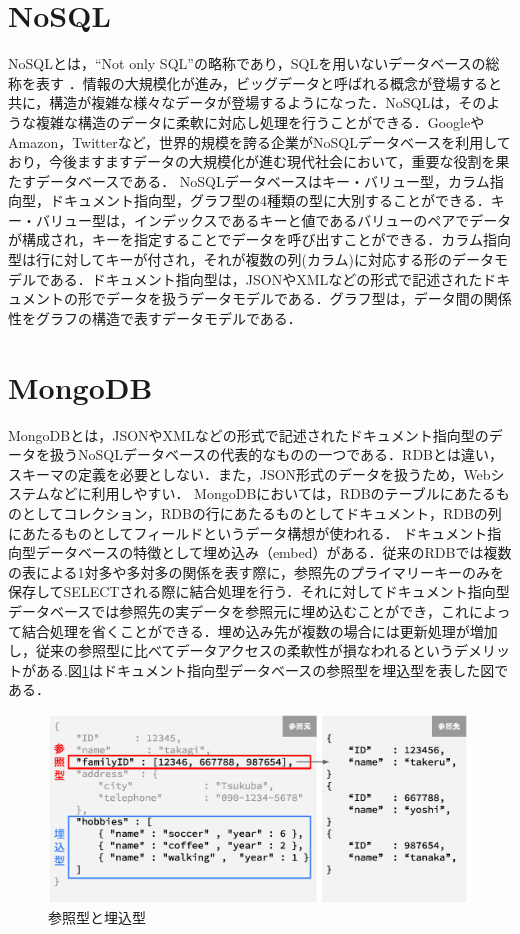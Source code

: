 \documentclass[a4paper,11pt]{ujreport}
\begin{document}
\section{NoSQL}
NoSQLとは，“Not only SQL”の略称であり，SQLを用いないデータベースの総称を表す \cite{太田201204}．情報の大規模化が進み，ビッグデータと呼ばれる概念が登場すると共に，構造が複雑な様々なデータが登場するようになった．NoSQLは，そのような複雑な構造のデータに柔軟に対応し処理を行うことができる．GoogleやAmazon，Twitterなど，世界的規模を誇る企業がNoSQLデータベースを利用しており，今後ますますデータの大規模化が進む現代社会において，重要な役割を果たすデータベースである\cite{太田201204}．
NoSQLデータベースはキー・バリュー型，カラム指向型，ドキュメント指向型，グラフ型の4種類の型に大別することができる．キー・バリュー型は，インデックスであるキーと値であるバリューのペアでデータが構成され，キーを指定することでデータを呼び出すことができる．カラム指向型は行に対してキーが付され，それが複数の列(カラム)に対応する形のデータモデルである．ドキュメント指向型は，JSONやXMLなどの形式で記述されたドキュメントの形でデータを扱うデータモデルである．グラフ型は，データ間の関係性をグラフの構造で表すデータモデルである\cite{太田201204}．

\section{MongoDB}
MongoDBとは，JSONやXMLなどの形式で記述されたドキュメント指向型のデータを扱うNoSQLデータベースの代表的なものの一つである．RDBとは違い，スキーマの定義を必要としない\cite{太田201204}\cite{mongodb}．また，JSON形式のデータを扱うため，Webシステムなどに利用しやすい．
MongoDBにおいては，RDBのテーブルにあたるものとしてコレクション，RDBの行にあたるものとしてドキュメント，RDBの列にあたるものとしてフィールドというデータ構想が使われる．
ドキュメント指向型データベースの特徴として埋め込み（embed）がある．従来のRDBでは複数の表による1対多や多対多の関係を表す際に，参照先のプライマリーキーのみを保存してSELECTされる際に結合処理を行う．それに対してドキュメント指向型データベースでは参照先の実データを参照元に埋め込むことができ，これによって結合処理を省くことができる．埋め込み先が複数の場合には更新処理が増加し，従来の参照型に比べてデータアクセスの柔軟性が損なわれるというデメリットがある\cite{Sky株式会社201212}.図\ref{EmbedReference}はドキュメント指向型データベースの参照型を埋込型を表した図である．
\begin{figure}[htbp]
	\begin{center}
		\includegraphics[width=30em, trim=0 5em 0 0]{src/EmbedReference.eps} %
	\end{center}
	\caption{参照型と埋込型}
	\label{EmbedReference}
\end{figure}
\end{document}
